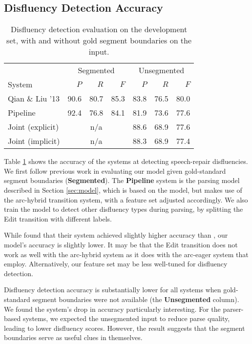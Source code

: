 \documentclass[11pt,letterpaper]{article}
\begin{document}
\subsection{Disfluency Detection Accuracy}

\begin{table}
    \centering
    \small
    \begin{tabular}{l|rrr|rrr}
        & \multicolumn{3}{c|}{Segmented}  & \multicolumn{3}{c}{Unsegmented} \\
        System & $P$ & $R$ & $F$ & $P$ & $R$ & $F$ \\
        \hline \hline
        Qian \& Liu '13         & 90.6 & 80.7  & 85.3  & 83.8 & 76.5 & 80.0 \\
        Pipeline                & 92.4 & 76.8  & 84.1  & 81.9 & 73.6 & 77.6 \\ 
        Joint (explicit)        & \multicolumn{3}{c|}{n/a} & 88.6 & 68.9 & 77.6 \\
        Joint (implicit)        & \multicolumn{3}{c|}{n/a} & 88.3 & 68.9 & 77.4 \\
        \hline
   \end{tabular}
    \caption{\small Disfluency detection evaluation on the development set,
             with and without gold segment boundaries on the input.
         \label{tab:dfl}}
\end{table}

Table \ref{tab:dfl} shows the accuracy of the systems at detecting speech-repair
disfluencies.  We first follow previous work in evaluating our model given
gold-standard segment boundaries (\textbf{Segmented}).  The \textbf{Pipeline}
system is the parsing model described in Section \ref{sec:model}, which is based
on the \citet{honnibal:14} model, but makes use of the arc-hybrid transition
system, with a feature set adjusted accordingly. We also train the model to
detect other disfluency types during parsing, by splitting the Edit
transition with different labels.

While \citet{honnibal:14} found that their system achieved slightly higher
accuracy than \citet{qian:13}, our model's accuracy is slightly lower.  It
may be that the Edit transition does not work as well with the arc-hybrid
system as it does with the arc-eager system that \citeauthor{honnibal:14} employ.
Alternatively, our feature set may be less well-tuned for disfluency detection.

Disfluency detection accuracy is substantially lower for all systems when
gold-standard segment boundaries were not available (the \textbf{Unsegmented}
column).  We found the \citet{qian:13} system's drop in accuracy particularly
interesting.  For the parser-based systems, we expected the unsegmented input
to reduce parse quality, leading to lower disfluency scores.  However, the
\citet{qian:13} result suggests that the segment boundaries serve as useful clues
in themselves.
\end{document}

